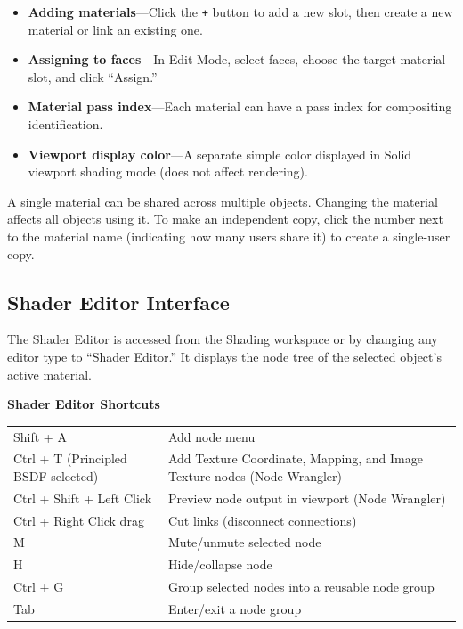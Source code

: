 \begin{itemize}[leftmargin=2em]
  \item \textbf{Adding materials}---Click the \texttt{+} button to
        add a new slot, then create a new material or link an
        existing one.
  \item \textbf{Assigning to faces}---In Edit Mode, select faces,
        choose the target material slot, and click ``Assign.''
  \item \textbf{Material pass index}---Each material can have a pass
        index for compositing identification.
  \item \textbf{Viewport display color}---A separate simple color
        displayed in Solid viewport shading mode (does not affect
        rendering).
\end{itemize}

A single material can be shared across multiple objects. Changing
the material affects all objects using it. To make an independent
copy, click the number next to the material name (indicating how
many users share it) to create a single-user copy.

\subsection{Shader Editor Interface}

The Shader Editor is accessed from the Shading workspace or by
changing any editor type to ``Shader Editor.'' It displays the node
tree of the selected object's active material.

\begin{shortcutbox}
\textbf{Shader Editor Shortcuts}

\begin{center}
\begin{tabularx}{\textwidth}{L{5cm}X}
\toprule
{}
 &  \\
\midrule
Shift + A & Add node menu \\
Ctrl + T (Principled BSDF selected) & Add Texture Coordinate, Mapping, and Image Texture nodes (Node Wrangler) \\
Ctrl + Shift + Left Click & Preview node output in viewport (Node Wrangler) \\
Ctrl + Right Click drag & Cut links (disconnect connections) \\
M & Mute/unmute selected node \\
H & Hide/collapse node \\
Ctrl + G & Group selected nodes into a reusable node group \\
Tab & Enter/exit a node group \\
\bottomrule
\end{tabularx}
\end{center}
\end{shortcutbox}

